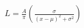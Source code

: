 \documentclass[10pt]{article}
\begin{document}
\begin{align*}L = \frac{A}{\pi} \left( \frac{\sigma}{(x - \mu)^2 + \sigma^2}\right)
\end{align*}
\end{document}
